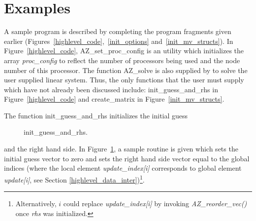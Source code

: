 \section{Examples\label{examples}}
A sample program is described by completing the program fragments given earlier
(Figures~\ref{highlevel_code},~\ref{init_options} and~\ref{init_mv_structs}).
In Figure~\ref{highlevel_code}, {\sf AZ\_set\_proc\_config} is an \Az{} utility
which initializes the array {\it proc\_config} to reflect the number of
processors being used and the node number of this processor. The function {\sf
  AZ\_solve} is also supplied by \Az{} to solve the user supplied linear
system. Thus, the only functions that the user must supply which have not
already been discussed include: {\sf init\_guess\_and\_rhs} in
Figure~\ref{highlevel_code} and {\sf create\_matrix} in
Figure~\ref{init_mv_structs}.

The function {\sf init\_guess\_and\_rhs} initializes the initial guess
\begin{figure}[Htbp]
  \caption{{\sf init\_guess\_and\_rhs}.}\label{init_guess_rhs}
\end{figure}
and the right hand side. In Figure~\ref{init_guess_rhs}, a sample routine is
given which sets the initial guess vector to zero and sets the right hand side
vector equal to the global indices (where the local element {\it
  update\_index[i]\/} corresponds to global element {\it update[i]\/}, see
Section \ref{highlevel_data_inter})\footnote{Alternatively, $i$ could replace
  {\sl update\_index[i]} by invoking {\sl AZ\_reorder\_vec()} once {\sl rhs}
  was initialized.}.

